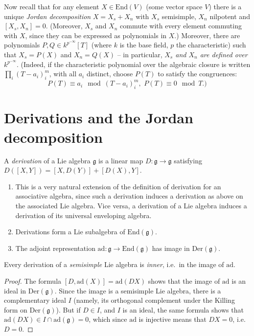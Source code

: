 Now recall that for any element $X\in \text{End}(V)$ (some vector space $V$) there is a unique \emph{Jordan decomposition} $X=X_s+X_n$ with $X_s$ semisimple, $X_n$ nilpotent and $[X_s,X_n]=0$. (Moreover, $X_s$ and $X_n$ commute with every element commuting with $X$, since they can be expressed as polynomials in $X$.) Moreover, there are polynomials $P,Q\in k^{p^{-\infty}}[T]$ (where $k$ is the base field, $p$ the characteristic) such that $X_s=P(X)$ and $X_n=Q(X)$ -- in particular, \emph{$X_s$ and $X_n$ are defined over $k^{p^{-\infty}}$}. (Indeed, if the characteristic polynomial over the algebraic closure is written $\prod_i (T-a_i)^m_i$, with all $a_i$ distinct, choose $P(T)$ to satisfy the congruences: 
$$ P(T)\equiv a_i \mod (T-a_i)^m_i, \,\, P(T)\equiv 0 \mod T.)$$


\section{Derivations and the Jordan decomposition}

\begin{definition}
 A \emph{derivation} of a Lie algebra $\mathfrak g$ is a linear map $D:\mathfrak g\to\mathfrak g$ satisfying $D([X,Y])=[X,D(Y)]+[D(X),Y]$.
\end{definition}

\begin{remarks}
 \begin{enumerate}
  \item This is a very natural extension of the definition of derivation for an associative algebra, since such a derivation induces a derivation as above on the associated Lie algebra. Vice versa, a derivation of a Lie algebra induces a derivation of its universal enveloping algebra.
  \item Derivations form a Lie subalgebra of $\text{End}(\mathfrak g)$.
  \item The adjoint representation $\text{ad}:\mathfrak g\to \text{End}(\mathfrak g)$ has image in $\text{Der}(\mathfrak g)$. 
 \end{enumerate}
\end{remarks}

\begin{proposition}\label{inner}
 Every derivation of a \emph{semisimple} Lie algebra is \emph{inner}, i.e.\ in the image of $\text{ad}$.
\end{proposition}

\begin{proof}
 The formula $[D,\text{ad}(X)]=\text{ad}(DX)$ shows that the image of $\text{ad}$ is an ideal in $\text{Der}(\mathfrak g)$. Since the image is a semisimple Lie algebra, there is a complementary ideal $I$ (namely, its orthogonal complement under the Killing form on $\text{Der}(\mathfrak g)$). But if $D\in I$, and $I$ is an ideal, the same formula shows that $\text{ad}(DX)\in I\cap \text{ad}(\mathfrak g)=0$, which since $\text{ad}$ is injective means that $DX=0$, i.e.\ $D=0$.
\end{proof}


